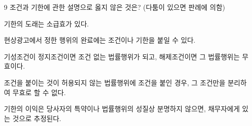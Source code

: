 \begin{question}{9}
조건과 기한에 관한 설명으로 옳지 않은 것은? (다툼이 있으면 판례에 의함)
\begin{choices}
  \item 기한의 도래는 소급효가 있다.
  \item 현상광고에서 정한 행위의 완료에는 조건이나 기한을 붙일 수 있다.
  \item 기성조건이 정지조건이면 조건 없는 법률행위가 되고, 해제조건이면 그 법률행위는 무효이다.
  \item 조건을 붙이는 것이 허용되지 않는 법률행위에 조건을 붙인 경우, 그 조건만을 분리하여 무효로 할 수 없다.
  \item 기한의 이익은 당사자의 특약이나 법률행위의 성질상 분명하지 않으면, 채무자에게 있는 것으로 추정된다.
\end{choices}
\end{question}
